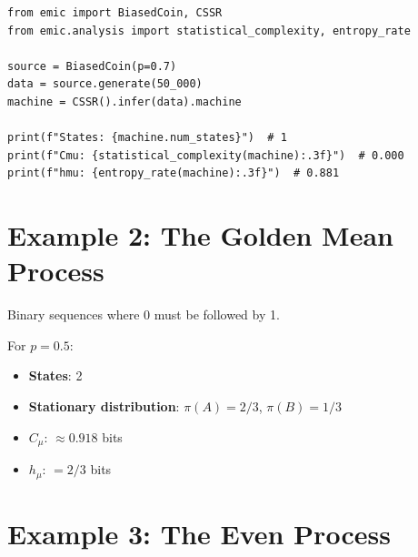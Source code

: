 \documentclass[11pt,a4paper]{article}
\theoremstyle{definition}
\theoremstyle{plain}
\newcommand{\Cmu}{C_\mu}
\newcommand{\hmu}{h_\mu}
\begin{document}
\begin{lstlisting}
from emic import BiasedCoin, CSSR
from emic.analysis import statistical_complexity, entropy_rate

source = BiasedCoin(p=0.7)
data = source.generate(50_000)
machine = CSSR().infer(data).machine

print(f"States: {machine.num_states}")  # 1
print(f"Cmu: {statistical_complexity(machine):.3f}")  # 0.000
print(f"hmu: {entropy_rate(machine):.3f}")  # 0.881
\end{lstlisting}

\section{Example 2: The Golden Mean Process}
\label{sec:example-golden-mean}

Binary sequences where 0 must be followed by 1.

\begin{center}
\end{center}

For $p = 0.5$:
\begin{itemize}
    \item \textbf{States}: 2
    \item \textbf{Stationary distribution}: $\pi(A) = 2/3$, $\pi(B) = 1/3$
    \item \textbf{$\Cmu$}: $\approx 0.918$ bits
    \item \textbf{$\hmu$}: $= 2/3$ bits
\end{itemize}

\section{Example 3: The Even Process}
\label{sec:example-even}
\end{document}
